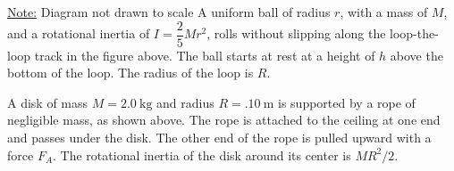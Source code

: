 \documentclass{../../oss-apphys-exam}
\begin{document}
\begin{questions}
{    \underline{Note:} Diagram not drawn to scale
  }
  \question A uniform ball of radius $r$, with a mass of $M$, and a rotational
  inertia of $I=\dfrac25Mr^2$, rolls without slipping along the loop-the-loop
  track in the figure above. The ball starts at rest at a height of $h$ above
  the bottom of the loop. The radius of the loop is $R$.
  \newpage
  
  \question A disk of mass $M =\SI{2.0}{\kilo\gram}$ and radius
  $R=\SI{.10}\metre$ is supported by a rope of negligible mass, as shown
  above. The rope is attached to the ceiling at one end and passes under the
  disk. The other end of the rope is pulled upward with a force $F_A$. The
  rotational inertia of the disk around its center is $MR^2/2$.
\end{questions}
\end{document}
